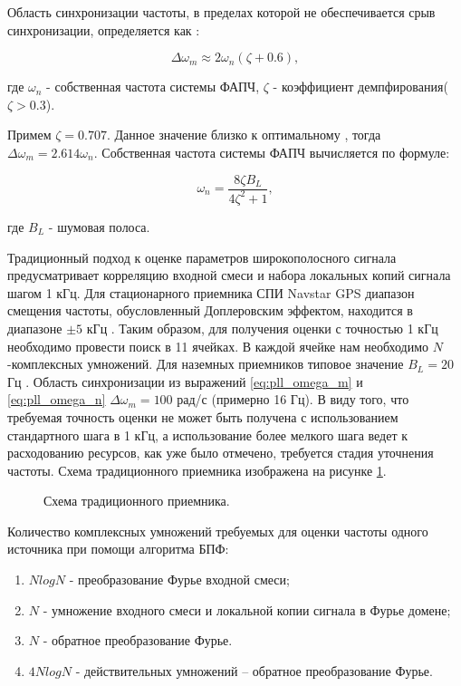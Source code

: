 Область синхронизации частоты, в пределах которой не обеспечивается срыв синхронизации, определяется как \cite{spilker-book}:
\begin{center}
\begin{equation}
	\label{eq:pll_omega_m}
	\Delta \omega_m \approx 2 \omega_n (\zeta+0.6),
\end{equation}
\end{center}
где ${\omega_n}$ - собственная частота системы ФАПЧ, ${\zeta}$ - коэффициент демпфирования(${\zeta > 0.3}$).

Примем ${\zeta = 0.707}$. Данное значение   близко к оптимальному \cite{tsui, spilker-book}, тогда ${\Delta \omega_m = 2.614 \omega_n}$.
Собственная частота системы ФАПЧ вычисляется по формуле:
\begin{center}
\begin{equation}
	\label{eq:pll_omega_n}
	\omega_n = \frac{8 \zeta B_L}{4 \zeta^2 + 1},
\end{equation}
\end{center}
где ${B_L}$ - шумовая полоса.

Традиционный подход к оценке параметров широкополосного сигнала предусматривает корреляцию входной смеси и набора локальных копий сигнала шагом 1 кГц.
Для стационарного приемника СПИ Navstar GPS диапазон смещения частоты, обусловленный Доплеровским эффектом, находится в диапазоне ${\pm 5}$ кГц \cite{tsui, shahtarin_sync}.
Таким образом, для получения оценки с точностью 1 кГц необходимо провести поиск в 11 ячейках. В каждой ячейке нам необходимо ${N}$-комплексных умножений.
Для наземных приемников типовое значение ${B_L=20}$ Гц \cite{tsui}. Область синхронизации из выражений \ref{eq:pll_omega_m} и \ref{eq:pll_omega_n}
${\Delta \omega_m = 100}$ рад/с (примерно 16 Гц). В виду того, что требуемая точность оценки не может быть получена с использованием стандартного шага в 1 кГц,
а использование более мелкого шага ведет к расходованию ресурсов, как уже было отмечено, требуется стадия уточнения частоты.
Схема традиционного приемника изображена на рисунке \ref{pic:corr_scheme}.
\begin{figure}[h]
	\center{}
	\caption{Схема традиционного приемника.}
	\label{pic:corr_scheme}
\end{figure}

Количество комплексных умножений требуемых для оценки частоты одного источника при помощи алгоритма БПФ:
\begin{enumerate}
\item ${NlogN}$ - преобразование Фурье входной смеси;
\item ${N}$ - умножение входного смеси и локальной копии сигнала в Фурье домене;
\item ${N}$ - обратное преобразование Фурье.
\item ${4NlogN}$ - действительных умножений – обратное преобразование Фурье. 
\end{enumerate}

